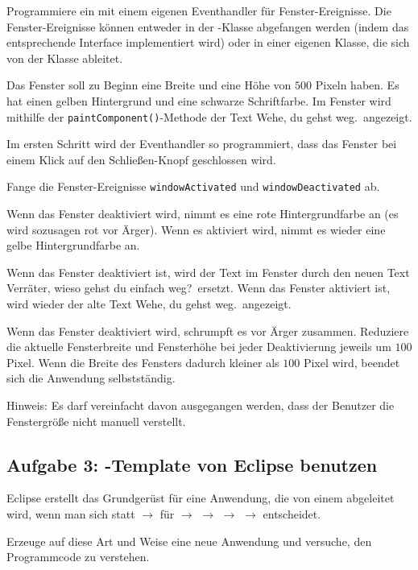 \begin{compactenum}[a)]
\item Programmiere ein  mit einem eigenen Eventhandler für
Fenster-Ereignisse. Die Fenster-Ereignisse können entweder in der
-Klasse abgefangen werden (indem das entsprechende Interface
implementiert wird) oder in einer eigenen Klasse, die sich von der Klasse
 ableitet.

Das Fenster soll zu Beginn eine Breite und eine Höhe von $500$ Pixeln haben. Es
hat einen gelben Hintergrund und eine schwarze Schriftfarbe. Im Fenster wird
mithilfe der \lstinline|paintComponent()|-Methode der Text \glqq Wehe, du gehst
weg.\grqq\ angezeigt.

Im ersten Schritt wird der Eventhandler so programmiert, dass das Fenster bei
einem Klick auf den \glqq Schließen\grqq -Knopf geschlossen wird.

\item Fange die Fenster-Ereignisse \lstinline|windowActivated| und
\lstinline|windowDeactivated| ab.

Wenn das Fenster deaktiviert wird, nimmt es eine rote Hintergrundfarbe an (es
wird sozusagen rot vor Ärger). Wenn es aktiviert wird, nimmt es wieder eine
gelbe Hintergrundfarbe an.

\item Wenn das Fenster deaktiviert ist, wird der Text im Fenster durch den neuen
Text \glqq Verräter, wieso gehst du einfach weg?\grqq\ ersetzt. Wenn das
Fenster aktiviert ist, wird wieder der alte Text \glqq Wehe, du gehst weg.\grqq\
angezeigt.

\item Wenn das Fenster deaktiviert wird, schrumpft es vor Ärger zusammen.
Reduziere die aktuelle Fensterbreite und Fensterhöhe bei jeder Deaktivierung
jeweils um $100$ Pixel. Wenn die Breite des Fensters dadurch kleiner als $100$
Pixel wird, beendet sich die Anwendung selbstständig.

Hinweis: Es darf vereinfacht davon ausgegangen werden, dass der Benutzer die
Fenstergröße nicht manuell verstellt.
\end{compactenum}


\subsection{Aufgabe 3: -Template von Eclipse benutzen}

Eclipse erstellt das Grundgerüst für eine Anwendung, die von einem
\myClass{JFrame} abgeleitet wird, wenn man sich statt  $\rightarrow$
\myPMI{Class} für \myPMI{New} $\rightarrow$ \myPMI{Other \ldots}
$\rightarrow$ \myPMI{WindowBuilder} $\rightarrow$ 
$\rightarrow$ \myPMI{JFrame} entscheidet.

Erzeuge auf diese Art und Weise eine neue Anwendung und versuche, den
Programmcode zu verstehen.
